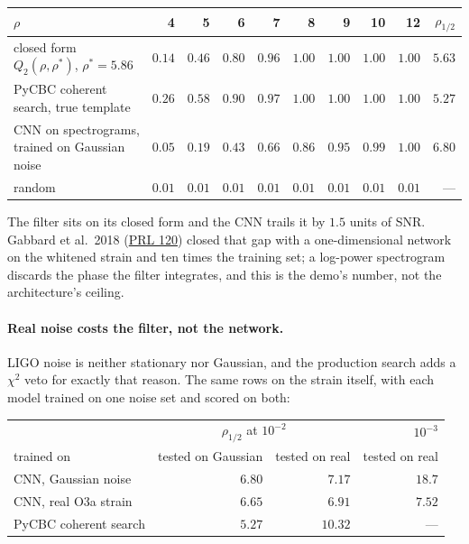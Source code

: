 \begin{center}
\small
\begin{tabular}{@{}l r r r r r r r r r@{}}
\hline
$\rho$ & 4 & 5 & 6 & 7 & 8 & 9 & 10 & 12 & $\rho_{1/2}$ \\
\hline
closed form $Q_2(\rho, \rho^\ast)$, $\rho^\ast = 5.86$ & $0.14$ & $0.46$ & $0.80$ & $0.96$ & $1.00$ & $1.00$ & $1.00$ & $1.00$ & $5.63$ \\
PyCBC coherent search, true template          & $0.26$ & $0.58$ & $0.90$ & $0.97$ & $1.00$ & $1.00$ & $1.00$ & $1.00$ & $\mathbf{5.27}$ \\
CNN on spectrograms, trained on Gaussian noise & $0.05$ & $0.19$ & $0.43$ & $0.66$ & $0.86$ & $0.95$ & $0.99$ & $1.00$ & $6.80$ \\
random                                        & $0.01$ & $0.01$ & $0.01$ & $0.01$ & $0.01$ & $0.01$ & $0.01$ & $0.01$ & --- \\
\hline
\end{tabular}
\end{center}

\noindent The filter sits on its closed form and the CNN trails it by $1.5$
units of SNR. Gabbard et al.\ 2018
(\href{https://doi.org/10.1103/PhysRevLett.120.141103}{PRL 120}) closed that
gap with a one-dimensional network on the whitened strain and ten times the
training set; a log-power spectrogram discards the phase the filter
integrates, and this is the demo's number, not the architecture's ceiling.

\paragraph{Real noise costs the filter, not the network.} LIGO noise is
neither stationary nor Gaussian, and the production search adds a $\chi^2$
veto for exactly that reason. The same rows on the strain itself, with each
model trained on one noise set and scored on both:

\begin{center}
\small
\begin{tabular}{@{}l r r r@{}}
\hline
 & \multicolumn{2}{c}{$\rho_{1/2}$ at $10^{-2}$} & $10^{-3}$ \\
trained on & tested on Gaussian & tested on real & tested on real \\
\hline
CNN, Gaussian noise         & $6.80$ & $7.17$ & $18.7$ \\
CNN, real O3a strain        & $6.65$ & $\mathbf{6.91}$ & $\mathbf{7.52}$ \\
PyCBC coherent search       & $\mathbf{5.27}$ & $10.32$ & --- \\
\hline
\end{tabular}
\end{center}

